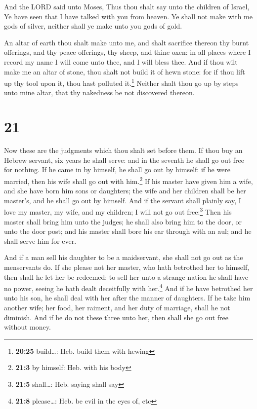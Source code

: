  And the LORD said unto Moses, Thus thou shalt say unto
the children of Israel, Ye have seen that I have talked with you from
heaven.  Ye shall not make with me gods of silver,
neither shall ye make unto you gods of gold.

 An altar of earth thou shalt make unto me, and shalt
sacrifice thereon thy burnt offerings, and thy peace offerings, thy
sheep, and thine oxen: in all places where I record my name I will come
unto thee, and I will bless thee.  And if thou wilt make
me an altar of stone, thou shalt not build it of hewn stone: for if thou
lift up thy tool upon it, thou hast polluted it.\footnote{\textbf{20:25}
  build\ldots: Heb. build them with hewing}  Neither
shalt thou go up by steps unto mine altar, that thy nakedness be not
discovered thereon.

\hypertarget{section-20}{%
\section{21}\label{section-20}}

 Now these are the judgments which thou shalt set before
them.  If thou buy an Hebrew servant, six years he shall
serve: and in the seventh he shall go out free for nothing.
 If he came in by himself, he shall go out by himself: if
he were married, then his wife shall go out with him.\footnote{\textbf{21:3}
  by himself: Heb. with his body}  If his master have
given him a wife, and she have born him sons or daughters; the wife and
her children shall be her master's, and he shall go out by himself.
 And if the servant shall plainly say, I love my master,
my wife, and my children; I will not go out free:\footnote{\textbf{21:5}
  shall\ldots: Heb. saying shall say}  Then his master
shall bring him unto the judges; he shall also bring him to the door, or
unto the door post; and his master shall bore his ear through with an
aul; and he shall serve him for ever.

 And if a man sell his daughter to be a maidservant, she
shall not go out as the menservants do.  If she please not
her master, who hath betrothed her to himself, then shall he let her be
redeemed: to sell her unto a strange nation he shall have no power,
seeing he hath dealt deceitfully with her.\footnote{\textbf{21:8}
  please\ldots: Heb. be evil in the eyes of, etc}  And if
he have betrothed her unto his son, he shall deal with her after the
manner of daughters.  If he take him another wife; her
food, her raiment, and her duty of marriage, shall he not diminish.
 And if he do not these three unto her, then shall she go
out free without money.

